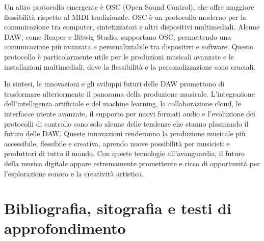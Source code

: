 \documentclass{book}
\begin{document}
Un altro protocollo emergente è OSC (Open Sound Control), che offre maggiore flessibilità rispetto al MIDI tradizionale. OSC è un protocollo moderno per la comunicazione tra computer, sintetizzatori e altri dispositivi multimediali. Alcune DAW, come Reaper e Bitwig Studio, supportano OSC, permettendo una comunicazione più avanzata e personalizzabile tra dispositivi e software. Questo protocollo è particolarmente utile per le produzioni musicali avanzate e le installazioni multimediali, dove la flessibilità e la personalizzazione sono cruciali.

In sintesi, le innovazioni e gli sviluppi futuri delle DAW promettono di trasformare ulteriormente il panorama della produzione musicale. L’integrazione dell’intelligenza artificiale e del machine learning, la collaborazione cloud, le interfacce utente avanzate, il supporto per nuovi formati audio e l’evoluzione dei protocolli di controllo sono solo alcune delle tendenze che stanno plasmando il futuro delle DAW. Queste innovazioni renderanno la produzione musicale più accessibile, flessibile e creativa, aprendo nuove possibilità per musicisti e produttori di tutto il mondo. Con queste tecnologie all’avanguardia, il futuro della musica digitale appare estremamente promettente e ricco di opportunità per l’esplorazione sonora e la creatività artistica.

\newpage

\chapter{Bibliografia, sitografia e testi di approfondimento}
\nocite{*}
\end{document}
